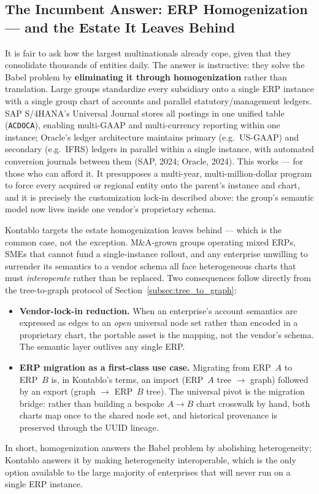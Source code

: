 \subsection{The Incumbent Answer: ERP Homogenization --- and the Estate It Leaves Behind}
\label{subsec:homogenization}
It is fair to ask how the largest multinationals already cope, given that they consolidate thousands of entities daily. The answer is instructive: they solve the Babel problem by \textbf{eliminating it through homogenization} rather than translation. Large groups standardize every subsidiary onto a single ERP instance with a single group chart of accounts and parallel statutory/management ledgers. SAP S/4HANA's Universal Journal stores all postings in one unified table (\texttt{ACDOCA}), enabling multi-GAAP and multi-currency reporting within one instance; Oracle's ledger architecture maintains primary (e.g.\ US-GAAP) and secondary (e.g.\ IFRS) ledgers in parallel within a single instance, with automated conversion journals between them (SAP, 2024; Oracle, 2024). This works --- for those who can afford it. It presupposes a multi-year, multi-million-dollar program to force every acquired or regional entity onto the parent's instance and chart, and it is precisely the customization lock-in described above: the group's semantic model now lives inside one vendor's proprietary schema.

Kontablo targets the estate homogenization leaves behind --- which is the common case, not the exception. M\&A-grown groups operating mixed ERPs, SMEs that cannot fund a single-instance rollout, and any enterprise unwilling to surrender its semantics to a vendor schema all face heterogeneous charts that must \emph{interoperate} rather than be replaced. Two consequences follow directly from the tree-to-graph protocol of Section~\ref{subsec:tree_to_graph}:

\begin{itemize}
    \item \textbf{Vendor-lock-in reduction.} When an enterprise's account semantics are expressed as edges to an \emph{open} universal node set rather than encoded in a proprietary chart, the portable asset is the mapping, not the vendor's schema. The semantic layer outlives any single ERP.
    \item \textbf{ERP migration as a first-class use case.} Migrating from ERP~$A$ to ERP~$B$ is, in Kontablo's terms, an import (ERP~$A$ tree $\rightarrow$ graph) followed by an export (graph $\rightarrow$ ERP~$B$ tree). The universal pivot is the migration bridge: rather than building a bespoke $A\!\rightarrow\!B$ chart crosswalk by hand, both charts map once to the shared node set, and historical provenance is preserved through the UUID lineage.
\end{itemize}

\noindent In short, homogenization answers the Babel problem by abolishing heterogeneity; Kontablo answers it by making heterogeneity interoperable, which is the only option available to the large majority of enterprises that will never run on a single ERP instance.
